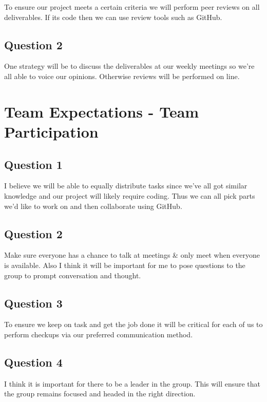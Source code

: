 \documentclass[fleqn, 12pt]{article}
\begin{document}
To ensure our project meets a certain criteria we will perform peer reviews on all deliverables. If its code then we can use review tools such as GitHub.

\subsection*{Question 2}

One strategy will be to discuss the deliverables at our weekly meetings so we're all able to voice our opinions. Otherwise reviews will be performed on line.

\section*{Team Expectations - Team Participation}

\subsection*{Question 1}

I believe we will be able to equally distribute tasks since we've all got similar knowledge and our project will likely require coding. Thus we can all pick parts we'd like to work on and then collaborate using GitHub.

\subsection*{Question 2}

Make sure everyone has a chance to talk at meetings \& only meet when everyone is available. Also I think it will be important for me to pose questions to the group to prompt conversation and thought.

\subsection*{Question 3}

To ensure we keep on task and get the job done it will be critical for each of us to perform checkups via our preferred communication method.

\subsection*{Question 4}

I think it is important for there to be a leader in the group. This will ensure that the group remains focused and headed in the right direction.
\end{document}
